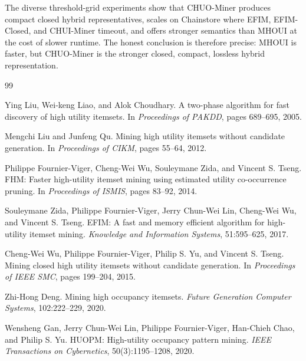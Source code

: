 \documentclass[11pt,a4paper]{article}
\begin{document}
The diverse threshold-grid experiments show that CHUO-Miner produces compact closed hybrid representatives, scales on Chainstore where EFIM, EFIM-Closed, and CHUI-Miner timeout, and offers stronger semantics than MHOUI at the cost of slower runtime. The honest conclusion is therefore precise: MHOUI is faster, but CHUO-Miner is the stronger closed, compact, lossless hybrid representation.

\begin{thebibliography}{99}

Ying Liu, Wei-keng Liao, and Alok Choudhary.
\newblock A two-phase algorithm for fast discovery of high utility itemsets.
\newblock In \emph{Proceedings of PAKDD}, pages 689--695, 2005.

Mengchi Liu and Junfeng Qu.
\newblock Mining high utility itemsets without candidate generation.
\newblock In \emph{Proceedings of CIKM}, pages 55--64, 2012.

Philippe Fournier-Viger, Cheng-Wei Wu, Souleymane Zida, and Vincent S. Tseng.
\newblock FHM: Faster high-utility itemset mining using estimated utility co-occurrence pruning.
\newblock In \emph{Proceedings of ISMIS}, pages 83--92, 2014.

Souleymane Zida, Philippe Fournier-Viger, Jerry Chun-Wei Lin, Cheng-Wei Wu, and Vincent S. Tseng.
\newblock EFIM: A fast and memory efficient algorithm for high-utility itemset mining.
\newblock \emph{Knowledge and Information Systems}, 51:595--625, 2017.

Cheng-Wei Wu, Philippe Fournier-Viger, Philip S. Yu, and Vincent S. Tseng.
\newblock Mining closed high utility itemsets without candidate generation.
\newblock In \emph{Proceedings of IEEE SMC}, pages 199--204, 2015.

Zhi-Hong Deng.
\newblock Mining high occupancy itemsets.
\newblock \emph{Future Generation Computer Systems}, 102:222--229, 2020.

Wensheng Gan, Jerry Chun-Wei Lin, Philippe Fournier-Viger, Han-Chieh Chao, and Philip S. Yu.
\newblock HUOPM: High-utility occupancy pattern mining.
\newblock \emph{IEEE Transactions on Cybernetics}, 50(3):1195--1208, 2020.

\end{thebibliography}
\end{document}
